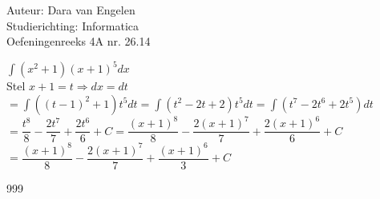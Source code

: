\documentclass[a4paper]{article}
\begin{document}
  
\noindent \large Auteur: Dara van Engelen \\
\noindent \large Studierichting: Informatica\\
\noindent \large Oefeningenreeks 4A nr. 26.14\\

\medskip

\normalsize

$\displaystyle\int (x^2+1)(x+1)^5dx$\\

Stel $ x+1 = t \Rightarrow dx = dt$\\

$ = \displaystyle\int ((t-1)^2 + 1)t^5dt = \displaystyle\int (t^2 - 2t +2)t^5dt = \displaystyle\int (t^7-2t^6 +2t^5)dt$\\

$ = \dfrac{t^8}{8} - \dfrac{2t^7}{7} + \dfrac{2t^6}{6} + C = \dfrac{(x+1)^8}{8} - \dfrac{2(x+1)^7}{7} + \dfrac{2(x+1)^6}{6} + C$\\

$ = \dfrac{(x+1)^8}{8} - \dfrac{2(x+1)^7}{7} + \dfrac{(x+1)^6}{3} + C$\\

\begin{thebibliography}{999}
\end{thebibliography}
\end{document}
